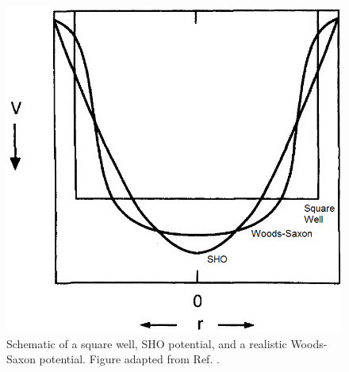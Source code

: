 \begin{figure}
\centerline{\includegraphics[height=0.25\textheight]{./img/c2/sho_approx.png}}
	\caption{Schematic of a square well, SHO potential, and a realistic Woods-Saxon potential. Figure adapted from Ref. \cite{casten}.\label{fig:chp2-SHOPot}}
\end{figure}


